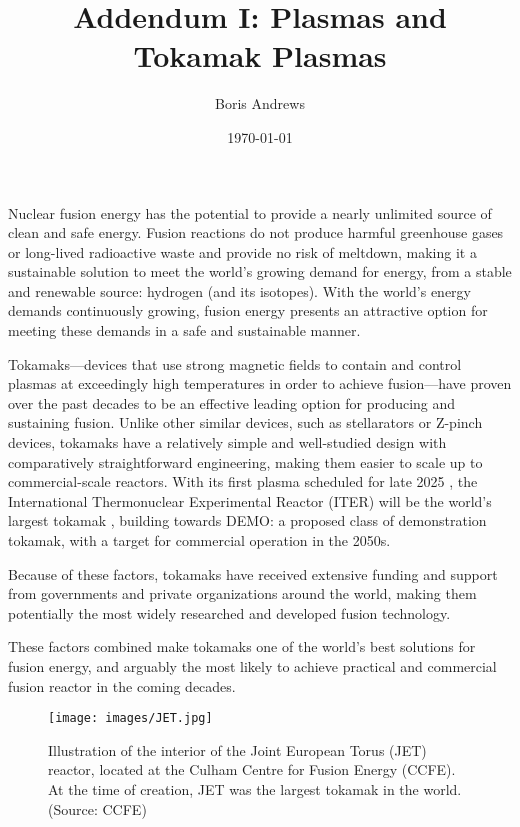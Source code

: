 \documentclass[12pt, a4paper]{article}
\title{Addendum I: Plasmas and Tokamak Plasmas}
\author{Boris Andrews}
\affil{Mathematical Institute, University of Oxford}
\date{\today}
\begin{document}
    \maketitle
    
    
    \tableofcontents
    \line


    Nuclear fusion energy has the potential to provide a nearly unlimited source of clean and safe energy. Fusion reactions do not produce harmful greenhouse gases or long-lived radioactive waste and provide no risk of meltdown, making it a sustainable solution to meet the world's growing demand for energy, from a stable and renewable source: hydrogen (and its isotopes). With the world's energy demands continuously growing, fusion energy presents an attractive option for meeting these demands in a safe and sustainable manner.

    \shortline

    Tokamaks---devices that use strong magnetic fields to contain and control plasmas at exceedingly high temperatures in order to achieve fusion---have proven over the past decades to be an effective leading option for producing and sustaining fusion. Unlike other similar devices, such as stellarators or Z-pinch devices, tokamaks have a relatively simple and well-studied  design with comparatively straightforward engineering, making them easier to scale up to commercial-scale reactors. With its first plasma scheduled for late 2025 \cite{ITER_schedule}, the International Thermonuclear Experimental Reactor (ITER) will be the world's largest tokamak \cite{Meade_2009, ITER_plan}, building towards DEMO: a proposed class of demonstration tokamak, with a target for commercial operation in the 2050s.
    
    Because of these factors, tokamaks have received extensive funding and support from governments and private organizations around the world, making them potentially the most widely researched and developed fusion technology.
    
    These factors combined make tokamaks one of the world's best solutions for fusion energy, and arguably the most likely to achieve practical and commercial fusion reactor in the coming decades.

    \begin{figure}[!ht]
        \centering
        \texttt{[image: images/JET.jpg]}
        \caption{Illustration of the interior of the Joint European Torus (JET) reactor, located at the Culham Centre for Fusion Energy (CCFE). At the time of creation, JET was the largest tokamak in the world. (Source: CCFE)}
    \end{figure}
\end{document}
